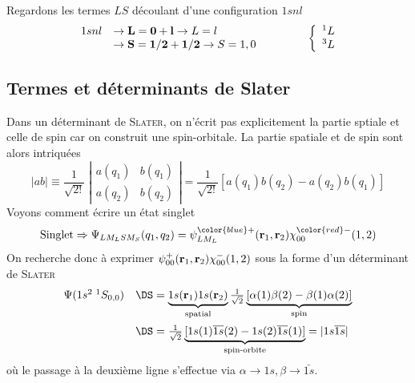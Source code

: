 Regardons les termes $LS$ découlant d'une configuration $1snl$
\begin{equation}
\begin{array}{ll}
1s nl  &\rightarrow  {\bf L} = {\bf 0}+ {\bf l}  \rightarrow L=l\\
&\rightarrow {\bf S} = {\bf 1/2}+ {\bf 1/2} 
 \rightarrow S=1,0
\end{array}\qquad \qquad \left\{
\begin{array}{l}
^1L \\
^3L
\end{array}
\right.
\end{equation}


\subsection{Termes et déterminants de Slater}
Dans un déterminant de \textsc{Slater}, on n'écrit pas explicitement la partie sptiale et celle de 
spin car on construit une spin-orbitale. La partie spatiale et de spin sont alors intriquées
\begin{equation}
\vert a b \vert \equiv \frac{1}{\sqrt{2!}} \;
\left\vert
\begin{array}{cc}
a(q_1) & b(q_1) \\
a(q_2) & b(q_2)
\end{array}
\right\vert
= \frac{1}{\sqrt{2!}} [ a(q_1) b(q_2) -  a(q_2) b(q_1) ]
\end{equation}
Voyons comment écrire un état singlet
\begin{equation}
\mbox{Singlet} \Rightarrow 
\Psi_{LM_LSM_S}(q_1,q_2) = 
\psi^{\color{blue} +}_{LM_L}( {\bf r}_1, {\bf r}_2) 
\chi^{\color{red} -}_{00}(1,2)
\end{equation}
On recherche donc à exprimer $\psi^{+}_{00}( {\bf r}_1, {\bf r}_2)  \chi^{-}_{00}(1,2)$ sous la forme
d'un déterminant de \textsc{Slater}
\begin{equation}
\begin{array}{ll}
\Psi (1s^2 \; ^1S_{0,0}) 
&\DS= \underbrace{1s( {\bf r}_1) 1s ({\bf r}_2)}_{\text{spatial}} \frac{1}{\sqrt{2}}\underbrace{  [\alpha(1) \beta(2) - \beta(1) \alpha(2) ]}_{\text{spin}}
\vspace{2mm}\\
&\DS = \frac{1}{\sqrt{2}} \underbrace{[ 1s(1) \overline{1s}(2) - 1s(2) \overline{1s}(1) ]}
_{\text{spin-orbite}}
=  \vert 1s \overline{1s} \vert
\end{array}
\end{equation}
où le passage à la deuxième ligne s'effectue via $\alpha\to 1s, \beta\to \bar{1s}$.\\

